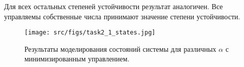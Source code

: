 Для всех остальных степеней устойчивости результат аналогичен. Все управляемы собственные числа принимают значение степени устойчивости.
\begin{figure}[ht!]
    \centering
    \texttt{[image: src/figs/task2\_1\_states.jpg]}
    \caption{Результаты моделирования состояний системы для различных \(\alpha\) с минимизированным управлением.}
    \label{fig:task2_2_states}
\end{figure}

\FloatBarrier